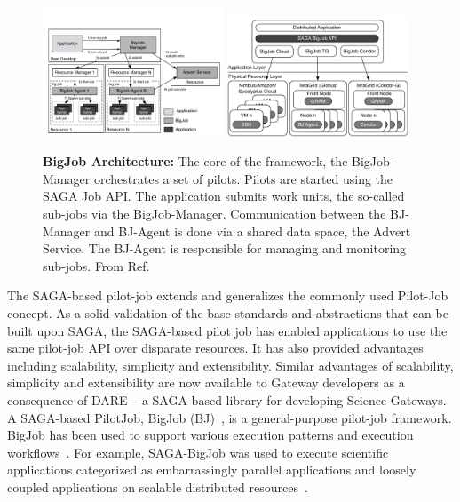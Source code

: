 \documentclass[]{svjour3}
\begin{document}
\begin{figure}[t]
 \centering
  \includegraphics[width=0.48\textwidth]{figures/re_bigjob_interactions.pdf}
 \includegraphics[width=0.48\textwidth]{figures/distributed_pilot_job.pdf}

    \caption{\textbf{BigJob Architecture:} The core of the
     framework, the BigJob-Manager orchestrates a set of
     pilots. Pilots are started using the SAGA Job API. The
     application submits work units, the so-called sub-jobs via the
     BigJob-Manager. Communication between the BJ-Manager and
     BJ-Agent is done via a shared data space, the Advert
     Service. The BJ-Agent is responsible for managing and
     monitoring sub-jobs. From
     Ref.~\cite{saga_bigjob_condor_cloud}}
    \label{fig:figures_re_bigjob_interactions}
\end{figure}

The SAGA-based pilot-job extends and generalizes the commonly used
Pilot-Job concept.  As a solid validation of the base standards and
abstractions that can be built upon SAGA, the SAGA-based pilot job has
enabled applications to use the same pilot-job API over disparate
resources. It has also provided advantages including scalability,
simplicity and extensibility. Similar advantages of scalability,
simplicity and extensibility are now available to Gateway developers
as a consequence of DARE – a SAGA-based library for developing Science
Gateways. A SAGA-based PilotJob, BigJob
(BJ)~\cite{bigjob_web,saga_bigjob_condor_cloud}, is a general-purpose
pilot-job framework. BigJob has been used to support various execution
patterns and execution workflows~\cite{async_repex11,saga-royalsoc}.
For example, SAGA-BigJob was used to execute scientific applications
categorized as embarrassingly parallel applications and loosely
coupled applications on scalable distributed
resources~\cite{ecmls_ccpe10, dare-ecmls11}.
\end{document}
